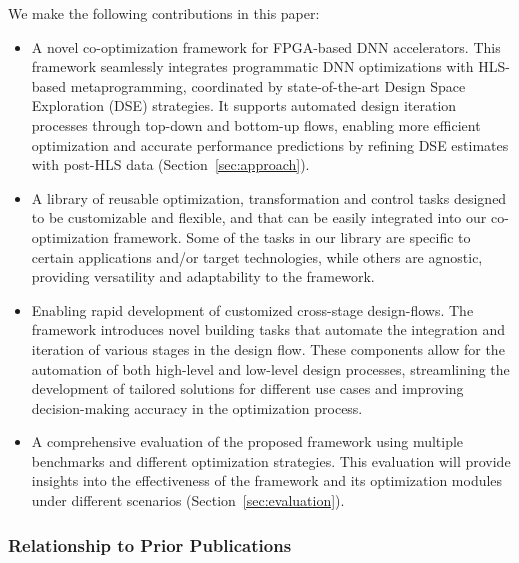 We make the following contributions in this paper:
\begin{itemize}
\item A novel co-optimization framework for FPGA-based DNN accelerators. This framework seamlessly integrates programmatic DNN optimizations with HLS-based metaprogramming, coordinated by state-of-the-art Design Space Exploration (DSE) strategies. It supports automated design iteration processes through top-down and bottom-up flows, enabling more efficient optimization and accurate performance predictions by refining DSE estimates with post-HLS data (Section~\ref{sec:approach}).


\item A library of reusable optimization, transformation and control tasks designed to be customizable and flexible, and that can be easily integrated into our co-optimization framework. Some of the tasks in our library are specific to certain applications and/or target technologies, while others are agnostic, providing versatility and adaptability to the framework.

\item Enabling rapid development of customized cross-stage design-flows. The framework introduces novel building tasks that automate the integration and iteration of various stages in the design flow. These components allow for the automation of both high-level and low-level design processes, streamlining the development of tailored solutions for different use cases and improving decision-making accuracy in the optimization process.


\item A comprehensive evaluation of the proposed framework using multiple benchmarks and different optimization strategies. This evaluation will provide insights into the effectiveness of the framework and its optimization modules under different scenarios (Section~\ref{sec:evaluation}).
\end{itemize}


\subsubsection*{Relationship to Prior Publications}

